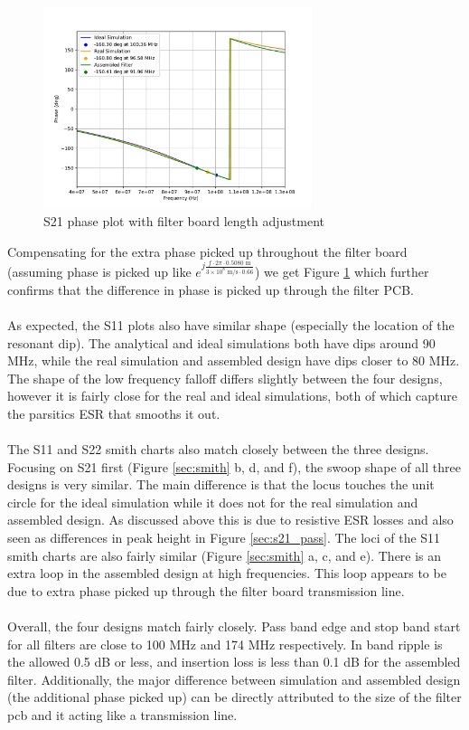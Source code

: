 \documentclass[letterpaper,12pt]{article}
\begin{document}
\begin{figure}[H]
  \centering \includegraphics[width=0.7\textwidth]{figures/9.phase_fixed.pdf}
  \caption{S21 phase plot with filter board length adjustment \label{fig:9.phase_fixed}}
\end{figure}
\noindent
Compensating for the extra phase picked up throughout the filter board (assuming phase is picked up like $e^{j\frac{f\cdot 2\pi \cdot 0.5080 \text{ m}}{3\times 10^8 \text{ m/s} \cdot 0.66}}$) we get Figure \ref{fig:9.phase_fixed} which further confirms that the difference in phase is picked up through the filter PCB.
\\
\\
As expected, the S11 plots also have similar shape (especially the location of the resonant dip). The analytical and ideal simulations both have dips around 90 MHz, while the real simulation and assembled design have dips closer to 80 MHz. The shape of the low frequency falloff differs slightly between the four designs, however it is fairly close for the real and ideal simulations, both of which capture the parsitics ESR that smooths it out.
\\
\\
The S11 and S22 smith charts also match closely between the three designs. Focusing on S21 first (Figure \ref{sec:smith} b, d, and f), the swoop shape of all three designs is very similar. The main difference is that the locus touches the unit circle for the ideal simulation while it does not for the real simulation and assembled design. As discussed above this is due to resistive ESR losses and also seen as differences in peak height in Figure \ref{sec:s21_pass}. The loci of the S11 smith charts are also fairly similar (Figure \ref{sec:smith} a, c, and e). There is an extra loop in the assembled design at high frequencies. This loop appears to be due to extra phase picked up through the filter board transmission line.
\\
\\
Overall, the four designs match fairly closely. Pass band edge and stop band start for all filters are close to 100 MHz and 174 MHz respectively. In band ripple is the allowed 0.5 dB or less, and insertion loss is less than 0.1 dB for the assembled filter. Additionally, the major difference between simulation and assembled design (the additional phase picked up) can be directly attributed to the size of the filter pcb and it acting like a transmission line.
\end{document}

